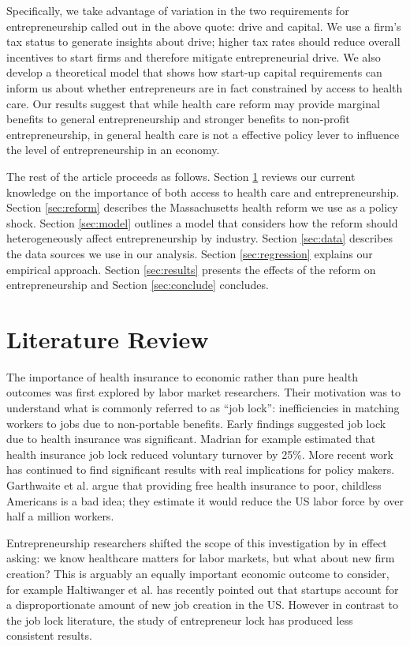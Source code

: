 \documentclass[12pt]{article}
\begin{document}
Specifically, we take advantage of variation in the two requirements for entrepreneurship called out in the above quote: drive and capital. We use a firm's tax status to generate insights about drive; higher tax rates should reduce overall incentives to start firms and therefore mitigate entrepreneurial drive. We also develop a theoretical model that shows how start-up capital requirements can inform us about whether entrepreneurs are in fact constrained by access to health care. Our results suggest that while health care reform may provide marginal benefits to general entrepreneurship and stronger benefits to non-profit entrepreneurship, in general health care is not a effective policy lever to influence the level of entrepreneurship in an economy.

The rest of the article proceeds as follows. Section \ref{sec:review} reviews our current knowledge on the importance of both access to health care and entrepreneurship. Section \ref{sec:reform} describes the Massachusetts health reform we use as a policy shock. Section \ref{sec:model} outlines a model that considers how the reform should heterogeneously affect entrepreneurship by industry. Section \ref{sec:data} describes the data sources we use in our analysis. Section \ref{sec:regression} explains our empirical approach. Section \ref{sec:results} presents the effects of the reform on entrepreneurship and Section \ref{sec:conclude} concludes. 

\section{Literature Review}
\label{sec:review}

The importance of health insurance to economic rather than pure health outcomes was first explored by labor market researchers. Their motivation was to understand what is commonly referred to as ``job lock'': inefficiencies in matching workers to jobs due to non-portable benefits. Early findings suggested job lock due to health insurance was significant. Madrian \cite{madrian} for example estimated that health insurance job lock reduced voluntary turnover by 25\%. More recent work has continued to find significant results with real implications for policy makers. Garthwaite et al. \cite{garthwaite} argue that providing free health insurance to poor, childless Americans is a bad idea; they estimate it would reduce the US labor force by over half a million workers. 

Entrepreneurship researchers shifted the scope of this investigation by in effect asking: we know healthcare matters for labor markets, but what about new firm creation? This is arguably an equally important economic outcome to consider, for example Haltiwanger et al. \cite{haltiwanger} has recently pointed out that startups account for a disproportionate amount of new job creation in the US. However in contrast to the job lock literature, the study of entrepreneur lock has produced less consistent results. 
\end{document}
